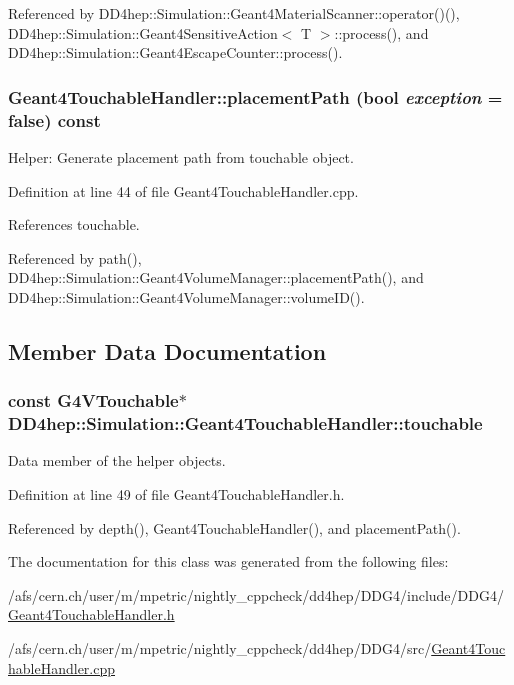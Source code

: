 Referenced by DD4hep::Simulation::Geant4MaterialScanner::operator()(), DD4hep::Simulation::Geant4SensitiveAction$<$ T $>$::process(), and DD4hep::Simulation::Geant4EscapeCounter::process().\hypertarget{class_d_d4hep_1_1_simulation_1_1_geant4_touchable_handler_a427aa0875c440d5c07bb18081072eea3}{
\subsubsection[{placementPath}]{ Geant4TouchableHandler::placementPath (bool {\em exception} = {\ttfamily false}) const}}
\label{class_d_d4hep_1_1_simulation_1_1_geant4_touchable_handler_a427aa0875c440d5c07bb18081072eea3}


Helper: Generate placement path from touchable object. 

Definition at line 44 of file Geant4TouchableHandler.cpp.

References touchable.

Referenced by path(), DD4hep::Simulation::Geant4VolumeManager::placementPath(), and DD4hep::Simulation::Geant4VolumeManager::volumeID().

\subsection{Member Data Documentation}
\hypertarget{class_d_d4hep_1_1_simulation_1_1_geant4_touchable_handler_a33a2263e30f96abe93ee3be5a189c3b4}{
\subsubsection[{touchable}]{\setlength{\rightskip}{0pt plus 5cm}const G4VTouchable$\ast$ {\bf DD4hep::Simulation::Geant4TouchableHandler::touchable}}}
\label{class_d_d4hep_1_1_simulation_1_1_geant4_touchable_handler_a33a2263e30f96abe93ee3be5a189c3b4}


Data member of the helper objects. 

Definition at line 49 of file Geant4TouchableHandler.h.

Referenced by depth(), Geant4TouchableHandler(), and placementPath().

The documentation for this class was generated from the following files:\begin{DoxyCompactItemize}
\item 
/afs/cern.ch/user/m/mpetric/nightly\_\-cppcheck/dd4hep/DDG4/include/DDG4/\hyperlink{_geant4_touchable_handler_8h}{Geant4TouchableHandler.h}\item 
/afs/cern.ch/user/m/mpetric/nightly\_\-cppcheck/dd4hep/DDG4/src/\hyperlink{_geant4_touchable_handler_8cpp}{Geant4TouchableHandler.cpp}\end{DoxyCompactItemize}
